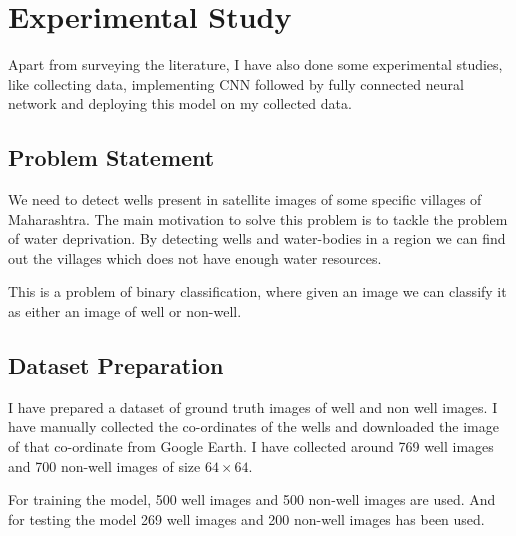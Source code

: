 \chapter{Experimental Study}
Apart from surveying the literature, I have also done some experimental studies, like collecting data, implementing CNN followed by fully connected neural network and deploying this model on my collected data. 

\section{Problem Statement}
We need to detect wells present in satellite images of some specific villages of Maharashtra. The main motivation to solve this problem is to tackle the problem of water deprivation. By detecting wells and water-bodies in a region we can find out the villages which does not have enough water resources.
\par This is a problem of binary classification, where given an image we can classify it as either an image of well or non-well.


\section{Dataset Preparation}
I have prepared a dataset of ground truth images of well and non well images. I have manually collected the co-ordinates of the wells and downloaded the image of that co-ordinate from Google Earth. I have collected around 769 well images and 700 non-well images of size $64\times 64$. 
\par For training the model, 500 well images and 500 non-well images are used. And for testing the model 269 well images and 200 non-well images has been used. 


